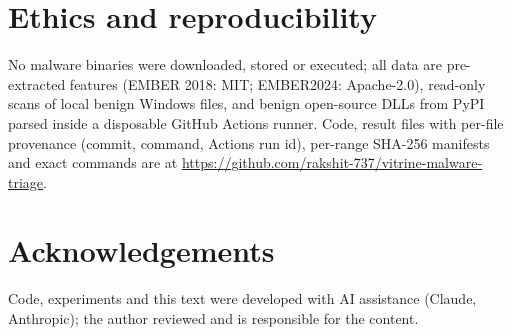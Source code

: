 \documentclass[10pt]{article}
\begin{document}
\section{Ethics and reproducibility}
No malware binaries were downloaded, stored or executed; all data are pre-extracted features
(EMBER 2018: MIT; EMBER2024: Apache-2.0), read-only scans of local benign Windows files, and benign
open-source DLLs from PyPI parsed inside a disposable GitHub Actions runner. Code, result files with
per-file provenance (commit, command, Actions run id), per-range SHA-256 manifests and exact commands
are at \url{https://github.com/rakshit-737/vitrine-malware-triage}.

\section*{Acknowledgements}
Code, experiments and this text were developed with AI assistance (Claude, Anthropic); the author
reviewed and is responsible for the content.



\end{document}

